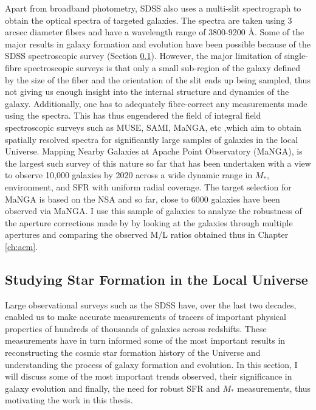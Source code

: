 Apart from broadband photometry, SDSS also uses a multi-slit spectrograph \citet{2009ApJS..182..543A} to obtain the optical spectra of targeted galaxies. The spectra are taken using 3 arcsec diameter fibers and have a wavelength range of 3800-9200 \AA. Some of the major results in galaxy formation and evolution have been possible because of the SDSS spectroscopic survey (Section \ref{sec: results}). However, the major limitation of single-fibre spectroscopic surveys is that only a small sub-region of the galaxy defined by the size of the fiber and the orientation of the slit ends up being sampled, thus not giving us enough insight into the internal structure and dynamics of the galaxy. Additionally, one has to adequately fibre-correct any measurements made using the spectra. This has thus engendered the field of integral field spectroscopic surveys such as MUSE, SAMI, MaNGA, etc ,which aim to obtain spatially resolved spectra for significantly large samples of galaxies in the local Universe. Mapping Nearby Galaxies at Apache Point Observatory (MaNGA), is the largest such survey of this nature so far that has been undertaken with a view to observe 10,000 galaxies by 2020 across a wide dynamic range in $M_{*}$, environment, and SFR with uniform radial coverage. The target selection for MaNGA is based on the NSA and so far, close to 6000 galaxies have been observed via MaNGA. I use this sample of galaxies to analyze the robustness of the aperture corrections made by \citet{kauffmann_environmental_2004} by looking at the galaxies through multiple apertures and comparing the observed M/L ratios obtained thus in Chapter \ref{ch:acm}.\\

\subsection{Studying Star Formation in the Local Universe}
\label{sec: results}

Large observational surveys such as the SDSS have, over the last two decades, enabled us to make accurate measurements of tracers of important physical properties of hundreds of thousands of galaxies across redshifts. These measurements have in turn informed some of the most important results in reconstructing the cosmic star formation history of the Universe and understanding the process of galaxy formation and evolution. In this section, I will discuss some of the most important trends observed, their significance in galaxy evolution and finally, the need for robust SFR and $M_{*}$ measurements, thus motivating the work in this thesis.\\

